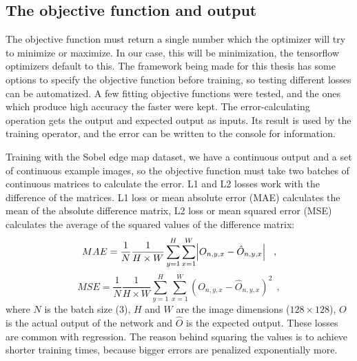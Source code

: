 \documentclass[12pt]{report}
\begin{document}
\subsection{The objective function and output}
The objective function must return a single number which the optimizer will try to minimize or maximize. In our case, this will be minimization, the tensorflow optimizers default to this. The framework being made for this thesis has some options to specify the objective function before training, so testing different losses can be automatized. A few fitting objective functions were tested, and the ones which produce high accuracy the faster were kept. The error-calculating operation gets the output and expected output as inputs. Its result is used by the training operator, and the error can be written to the console for information.

Training with the Sobel edge map dataset, we have a continuous output and a set of continuous example images, so the objective function must take two batches of continuous matrices to calculate the error. L1 and L2 losses work with the difference of the matrices. L1 loss or mean absolute error (MAE) calculates the mean of the absolute difference matrix, L2 loss or mean squared error (MSE) calculates the average of the squared values of the difference matrix:
\begin{equation*}
MAE = \frac{1}{N}\frac{1}{H\times W}\sum_{y=1}^{H}\sum_{x=1}^{W}\abs{O_{n,y,x}-\hat{O}_{n,y,x}}\ \ ,
\end{equation*}
\begin{equation*}
MSE = \frac{1}{N}\frac{1}{H\times W}\sum_{y=1}^{H}\sum_{x=1}^{W}\left(O_{n,y,x}-\hat{O}_{n,y,x}\right)^{2}\ \ ,
\end{equation*}
where $N$ is the batch size ($3$), $H$ and $W$ are the image dimensions ($128\times128$), $O$ is the actual output of the network and $\hat{O}$ is the expected output. These losses are common with regression. The reason behind squaring the values is to achieve shorter training times, because bigger errors are penalized exponentially more.
\end{document}
